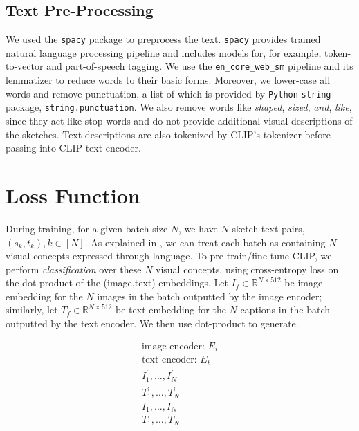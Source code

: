 \subsection{Text Pre-Processing}
We used the \texttt{spacy} package to preprocess the text. \texttt{spacy} provides trained natural language processing pipeline and includes models for, for example, token-to-vector and part-of-speech tagging. We use the \texttt{en\_core\_web\_sm} pipeline and its lemmatizer to reduce words to their basic forms. Moreover, we lower-case all words and remove punctuation, a list of which is provided by \texttt{Python} \texttt{string} package, \texttt{string.punctuation}. We also remove words like \textit{shaped}, \textit{sized}, \textit{and}, \textit{like}, since they act like stop words and do not provide additional visual descriptions of the sketches. Text descriptions are also tokenized by CLIP's tokenizer before passing into CLIP text encoder.     

\section{Loss Function}
During training, for a given batch size $N$, we have $N$ sketch-text pairs, $(s_k,t_k), k\in [N]$. 
As explained in \cite{CLIPpaper}, we can treat each batch as containing $N$ visual concepts expressed through language.    
To pre-train/fine-tune CLIP, we perform \textit{classification} over these $N$ visual concepts, using cross-entropy loss on the dot-product of the (image,text) embeddings. 
Let $I_f \in \mathbb{R}^{N \times 512}$ be image embedding for the $N$ images in the batch outputted by the image encoder; similarly, 
let $T_f \in \mathbb{R}^{N \times 512}$ be text embedding for the $N$ captions in the batch outputted by the text encoder. 
We then use dot-product to generate.

\begin{equation}
\begin{split}
    \text{image encoder: } E_i \\
    \text{text encoder: } E_t \\
    I_1^{'},\dots, I_N^{'} \\
    T_1^{'},\dots, T_N^{'} \\
    I_1,\dots, I_N \\
    T_1,\dots, T_N \\
\end{split}
\end{equation}


